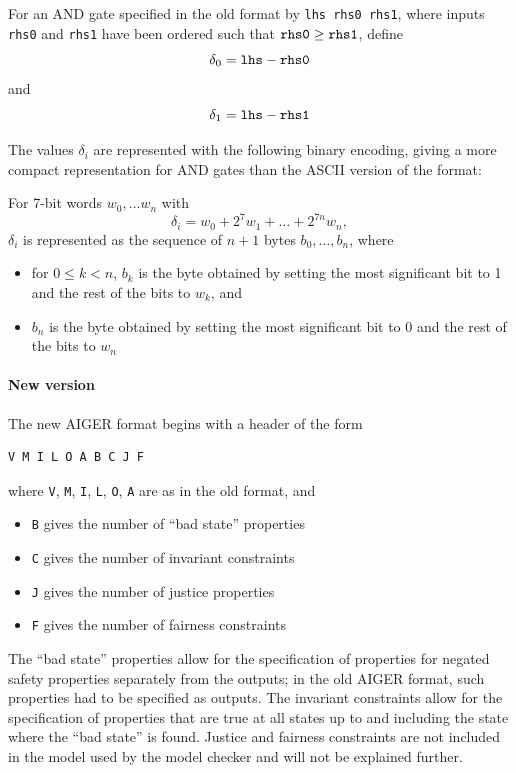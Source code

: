 \documentclass[12pt,a4paper,twoside,openright]{report}
\begin{document}
{{For an AND gate specified in the old format by \verb,lhs rhs0 rhs1,,
where inputs \verb,rhs0, and \verb,rhs1, have been ordered such that
$\verb,rhs0, \geq \verb,rhs1,$, define
$$\delta_0 = \verb,lhs, - \verb,rhs0,$$
and
$$\delta_1 = \verb,lhs, - \verb,rhs1,$$

The values $\delta_i$ are represented with the following binary
encoding, giving a more compact representation for AND gates than
the ASCII version of the format:

For 7-bit words $w_0, \ldots w_n$ with
$$\delta_i = w_0 + 2^7w_1 + \ldots + 2^{7n}w_n,$$
$\delta_i$ is represented as the sequence of $n + 1$ bytes
$b_0, \ldots, b_n$, where
\begin{itemize}
\item for $0 \leq k < n$, $b_k$ is the byte obtained by setting the most
significant bit to 1 and the rest of the bits to $w_k$, and
\item $b_n$ is the byte obtained by setting the most
significant bit to 0 and the rest of the bits to $w_n$
\end{itemize}}

\paragraph{New version} {
The new AIGER format begins with a header of the form
\begin{verbatim}
V M I L O A B C J F
\end{verbatim}
where \verb,V,, \verb,M,, \verb,I,, \verb,L,, \verb,O,, \verb,A, are as
in the old format, and
\begin{itemize}
\item \verb,B, gives the number of ``bad state'' properties
\item \verb,C, gives the number of invariant constraints
\item \verb,J, gives the number of justice properties
\item \verb,F, gives the number of fairness constraints
\end{itemize}

The ``bad state'' properties allow for the specification of properties for
negated safety properties separately from the outputs; in
the old AIGER format, such properties had to be specified as outputs.
The invariant constraints allow for the specification of properties that
are true at all states up to and including the state where the ``bad state''
is found.
Justice and fairness constraints are not included in the model used by
the model checker and will not be explained further.

}}
\end{document}
